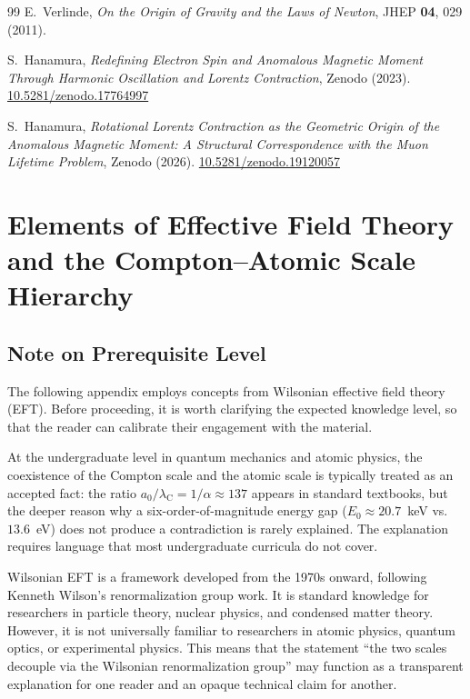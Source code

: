 \documentclass[%
 reprint, amsmath,amssymb, aps, prb, ]{revtex4-2}
\numberwithin{equation}{section}
\newcommand{\lambdaC}{\lambda_{\mathrm{C}}}
\begin{document}
\begin{thebibliography}{99}
E.~Verlinde, \textit{On the Origin of Gravity and the Laws of Newton}, JHEP \textbf{04}, 029 (2011).

S.~Hanamura, \textit{Redefining Electron Spin and Anomalous Magnetic Moment Through Harmonic Oscillation and Lorentz Contraction}, Zenodo (2023). \href{https://doi.org/10.5281/zenodo.17764997}{10.5281/zenodo.17764997}

S.~Hanamura, \textit{Rotational Lorentz Contraction as the Geometric Origin of the Anomalous Magnetic Moment: A Structural Correspondence with the Muon Lifetime Problem}, Zenodo (2026). \href{https://doi.org/10.5281/zenodo.19120057}{10.5281/zenodo.19120057}

\end{thebibliography}

\appendix

\section{Elements of Effective Field Theory and the Compton--Atomic Scale Hierarchy}
\label{app:eft}

\subsection*{Note on Prerequisite Level}

The following appendix employs concepts from Wilsonian effective field theory (EFT). Before proceeding, it is worth clarifying the expected knowledge level, so that the reader can calibrate their engagement with the material.

At the undergraduate level in quantum mechanics and atomic physics, the coexistence of the Compton scale and the atomic scale is typically treated as an accepted fact: the ratio $a_0/\lambdaC = 1/\alpha \approx 137$ appears in standard textbooks, but the deeper reason why a six-order-of-magnitude energy gap ($E_0 \approx 20.7$~keV vs.\ $13.6$~eV) does not produce a contradiction is rarely explained. The explanation requires language that most undergraduate curricula do not cover.

Wilsonian EFT is a framework developed from the 1970s onward, following Kenneth Wilson's renormalization group work. It is standard knowledge for researchers in particle theory, nuclear physics, and condensed matter theory. However, it is not universally familiar to researchers in atomic physics, quantum optics, or experimental physics. This means that the statement ``the two scales decouple via the Wilsonian renormalization group'' may function as a transparent explanation for one reader and an opaque technical claim for another.
\end{document}
